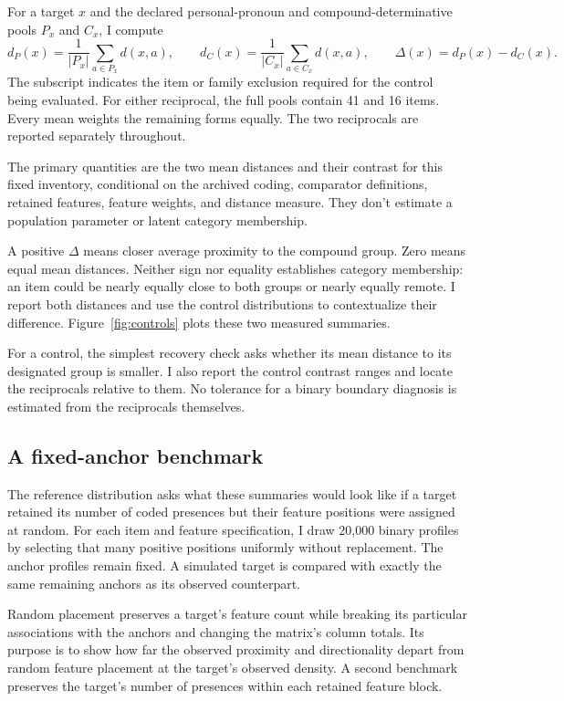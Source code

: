 \documentclass[12pt]{article}
\begin{document}
For a target $x$ and the declared personal-pronoun and compound-determinative pools $P_x$ and $C_x$, I compute
\[
 d_P(x)=\frac{1}{|P_x|}\sum_{a\in P_x}d(x,a),\qquad
 d_C(x)=\frac{1}{|C_x|}\sum_{a\in C_x}d(x,a),\qquad
 \Delta(x)=d_P(x)-d_C(x).
\]
The subscript indicates the item or family exclusion required for the control being evaluated. For either reciprocal, the full pools contain 41 and 16 items. Every mean weights the remaining forms equally. The two reciprocals are reported separately throughout.

The primary quantities are the two mean distances and their contrast for this fixed inventory, conditional on the archived coding, comparator definitions, retained features, feature weights, and distance measure. They don't estimate a population parameter or latent category membership.

A positive $\Delta$ means closer average proximity to the compound group. Zero means equal mean distances. Neither sign nor equality establishes category membership: an item could be nearly equally close to both groups or nearly equally remote. I report both distances and use the control distributions to contextualize their difference. Figure~\ref{fig:controls} plots these two measured summaries.

For a control, the simplest recovery check asks whether its mean distance to its designated group is smaller. I also report the control contrast ranges and locate the reciprocals relative to them. No tolerance for a binary boundary diagnosis is estimated from the reciprocals themselves.

\subsection{A fixed-anchor benchmark}

The reference distribution asks what these summaries would look like if a target retained its number of coded presences but their feature positions were assigned at random. For each item and feature specification, I draw 20,000 binary profiles by selecting that many positive positions uniformly without replacement. The anchor profiles remain fixed. A simulated target is compared with exactly the same remaining anchors as its observed counterpart.

Random placement preserves a target's feature count while breaking its particular associations with the anchors and changing the matrix's column totals. Its purpose is to show how far the observed proximity and directionality depart from random feature placement at the target's observed density. A second benchmark preserves the target's number of presences within each retained feature block.
\end{document}
